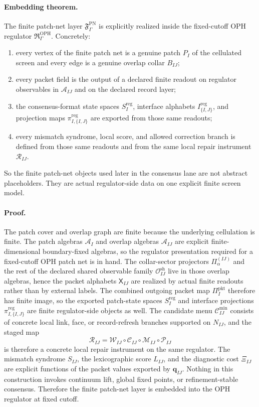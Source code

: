 \documentclass[11pt]{article}
\begin{document}
\paragraph{Embedding theorem.}
The finite patch-net layer $\mathfrak F_{\Gamma}^{\mathrm{PN}}$ is explicitly realized inside
the fixed-cutoff OPH regulator $\mathfrak R_{\Gamma}^{\mathrm{OPH}}$. Concretely:
\begin{enumerate}[leftmargin=2em]
\item every vertex of the finite patch net is a genuine patch $P_I$ of the cellulated screen and
every edge is a genuine overlap collar $B_{IJ}$;
\item every packet field is the output of a declared finite readout on regulator observables in
$\mathcal A_{IJ}$ and on the declared record layer;
\item the consensus-format state spaces $S_I^{\mathrm{reg}}$, interface alphabets
$I_{\{I,J\}}^{\mathrm{reg}}$, and projection maps
$\pi_{I,\{I,J\}}^{\mathrm{reg}}$ are exported from those same readouts;
\item every mismatch syndrome, local score, and allowed correction branch is defined from those
same readouts and from the same local repair instrument $\mathcal R_{IJ}$.
\end{enumerate}
So the finite patch-net objects used later in the consensus lane are not abstract placeholders.
They are actual regulator-side data on one explicit finite screen model.

\paragraph{Proof.}
The patch cover and overlap graph are finite because the underlying cellulation is finite. The
patch algebras $\mathcal A_I$ and overlap algebras $\mathcal A_{IJ}$ are explicit
finite-dimensional boundary-fixed algebras, so the regulator presentation required for a
fixed-cutoff OPH patch net is in hand. The collar-sector projectors
$\Pi_{\alpha}^{(IJ)}$ and the rest of the declared shared observable family
$\mathcal O_{IJ}^{\mathrm{sh}}$ live in those overlap algebras, hence the packet alphabets
$\mathsf X_{IJ}$ are realized by actual finite readouts rather than by external labels. The
combined outgoing packet map $\Pi_I^{\mathrm{pkt}}$ therefore has finite image, so the exported
patch-state spaces $S_I^{\mathrm{reg}}$ and interface projections
$\pi_{I,\{I,J\}}^{\mathrm{reg}}$ are finite regulator-side objects as well. The candidate menu $\mathcal C_{IJ}^{\mathrm{min}}$ consists of concrete local link, face, or
record-refresh branches supported on $N_{IJ}$, and the staged map
\begin{equation}
\mathcal R_{IJ}
=
\mathcal W_{IJ}\circ \mathcal C_{IJ}\circ \mathcal M_{IJ}\circ \mathcal P_{IJ}
\end{equation}
is therefore a concrete local repair instrument on the same regulator. The mismatch syndrome
$S_{IJ}$, the lexicographic score $L_{IJ}$, and the diagnostic cost $\Xi_{IJ}$ are explicit
functions of the packet values exported by $\mathbf q_{IJ}$. Nothing in this construction invokes
continuum lift, global fixed points, or refinement-stable consensus. Therefore the finite
patch-net layer is embedded into the OPH regulator at fixed cutoff.
\end{document}
